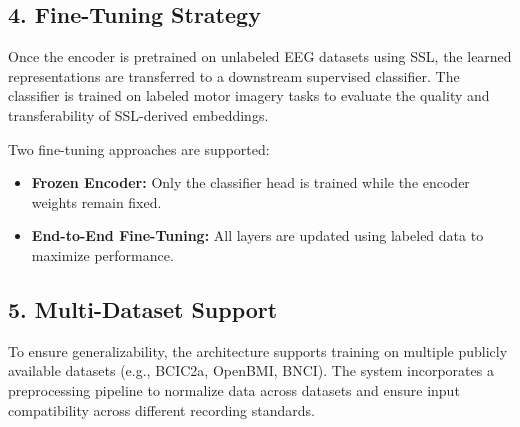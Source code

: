 \subsection*{4. Fine-Tuning Strategy}

Once the encoder is pretrained on unlabeled EEG datasets using SSL, the learned representations are transferred to a downstream supervised classifier. The classifier is trained on labeled motor imagery tasks to evaluate the quality and transferability of SSL-derived embeddings.

Two fine-tuning approaches are supported:
\begin{itemize}
    \item \textbf{Frozen Encoder:} Only the classifier head is trained while the encoder weights remain fixed.
    \item \textbf{End-to-End Fine-Tuning:} All layers are updated using labeled data to maximize performance.
\end{itemize}

\subsection*{5. Multi-Dataset Support}

To ensure generalizability, the architecture supports training on multiple publicly available datasets (e.g., BCIC2a, OpenBMI, BNCI). The system incorporates a preprocessing pipeline to normalize data across datasets and ensure input compatibility across different recording standards.
